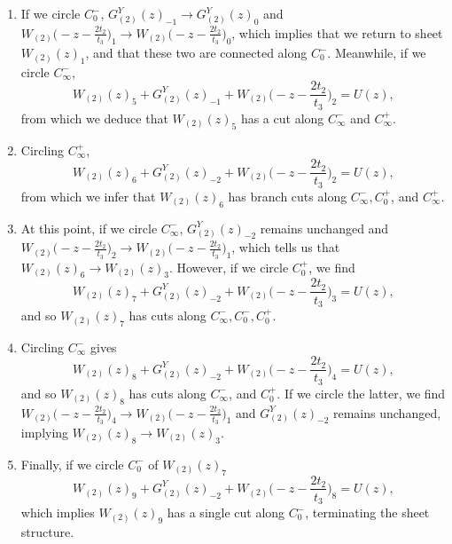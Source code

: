 \begin{enumerate}[label=(\roman*)]
    \item If we circle $C_0^-$, $G_{(2)}^Y(z)_{-1}\rightarrow G_{(2)}^Y(z)_0$ and
          $W_{(2)}\big(-z-\frac{2t_2}{t_3}\big)_1\rightarrow W_{(2)}\big(-z-\frac{2t_2}{t_3}\big)_0$, which
          implies that we return to sheet $W_{(2)}(z)_1$, and that these two are connected along $C_0^-$.
          Meanwhile, if we circle $C_{\infty}^-$,
          \begin{equation}
              W_{(2)}(z)_5 + G_{(2)}^Y(z)_{-1} + W_{(2)}\big(-z-\frac{2t_2}{t_3}\big)_2 = U(z),
          \end{equation}
          from which we deduce that $W_{(2)}(z)_5$ has a cut along $C_{\infty}^-$ and $C_{\infty}^+$.

    \item Circling $C_{\infty}^+$,
          \begin{equation}
              W_{(2)}(z)_6 + G_{(2)}^Y(z)_{-2}+W_{(2)}\big(-z-\frac{2t_2}{t_3}\big)_2=U(z),
          \end{equation}
          from which we infer that $W_{(2)}(z)_6$ has branch cuts along $C_{\infty}^-, C_0^+$, and
          $C_{\infty}^+$.

    \item At this point, if we circle $C_{\infty}^-$, $G_{(2)}^Y(z)_{-2}$ remains unchanged and
          $W_{(2)}\big(-z-\frac{2t_2}{t_3}\big)_2\rightarrow W_{(2)}\big(-z-\frac{2t_2}{t_3}\big)_1$, which
          tells us that $W_{(2)}(z)_6\rightarrow W_{(2)}(z)_3$. However, if we circle $C_0^+$, we find
          \begin{equation}
              W_{(2)}(z)_7 + G_{(2)}^Y(z)_{-2} + W_{(2)}\big(-z-\frac{2t_2}{t_3}\big)_3 = U(z),
          \end{equation}
          and so $W_{(2)}(z)_7$ has cuts along $C_{\infty}^-, C_0^-, C_0^+$.

    \item Circling $C_{\infty}^-$ gives
          \begin{equation}
              W_{(2)}(z)_8 + G_{(2)}^Y(z)_{-2} + W_{(2)}\big(-z-\frac{2t_2}{t_3}\big)_4 = U(z),
          \end{equation}
          and so $W_{(2)}(z)_8$ has cuts along $C_{\infty}^-$, and $C_0^+$. If we circle the latter, we find
          $W_{(2)}\big(-z-\frac{2t_2}{t_3}\big)_4\rightarrow W_{(2)}\big(-z-\frac{2t_2}{t_3}\big)_1$ and
          $G_{(2)}^Y(z)_{-2}$ remains unchanged, implying $W_{(2)}(z)_8 \rightarrow W_{(2)}(z)_3$.

    \item Finally, if we circle $C_0^-$ of $W_{(2)}(z)_7$
          \begin{equation}
              W_{(2)}(z)_9 + G_{(2)}^Y(z)_{-2}+W_{(2)}\big(-z-\frac{2t_2}{t_3}\big)_8 = U(z),
          \end{equation}
          which implies $W_{(2)}(z)_9$ has a single cut along $C_0^-$, terminating the sheet structure.
\end{enumerate}
